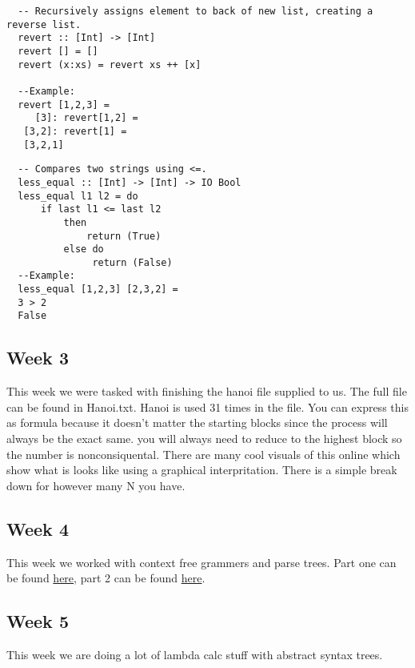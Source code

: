 \documentclass{article}
\theoremstyle{theorem}
\theoremstyle{definition}
\theoremstyle{remark}
\begin{document}
\begin{lstlisting}
  -- Recursively assigns element to back of new list, creating a reverse list.
  revert :: [Int] -> [Int]
  revert [] = []
  revert (x:xs) = revert xs ++ [x]

  --Example:
  revert [1,2,3] = 
     [3]: revert[1,2] =
   [3,2]: revert[1] =
   [3,2,1]
\end{lstlisting}
\begin{lstlisting}
  -- Compares two strings using <=.
  less_equal :: [Int] -> [Int] -> IO Bool
  less_equal l1 l2 = do
      if last l1 <= last l2
          then 
              return (True)
          else do
               return (False)
  --Example:
  less_equal [1,2,3] [2,3,2] = 
  3 > 2
  False
\end{lstlisting}
\subsection{Week 3}

This week we were tasked with finishing the hanoi file supplied to us. The full file can be found 
in Hanoi.txt.
Hanoi is used 31 times in the file. 
You can express this as formula because it doesn't matter the starting blocks since the process will always be the exact same.
you will always need to reduce to the highest block so the number is nonconsiquental. There are many cool visuals of this online which show what is looks like using a graphical interpritation. There is a simple break down for however many N you have. 

\subsection{Week 4}
This week we worked with context free grammers and parse trees. Part one can be found \href {https://github.com/jacgoldberg/Programming-Lang/blob/main/Note%20Sep%2025%2C%202022.pdf}{here}, part 2 can be found 
\href {https://github.com/jacgoldberg/Programming-Lang/blob/main/Note%20Sep%2025%2C%202022%20(2).pdf} {here}. 

\subsection{Week 5}
This week we are doing a lot of lambda calc stuff with abstract syntax trees.
\end{document}
